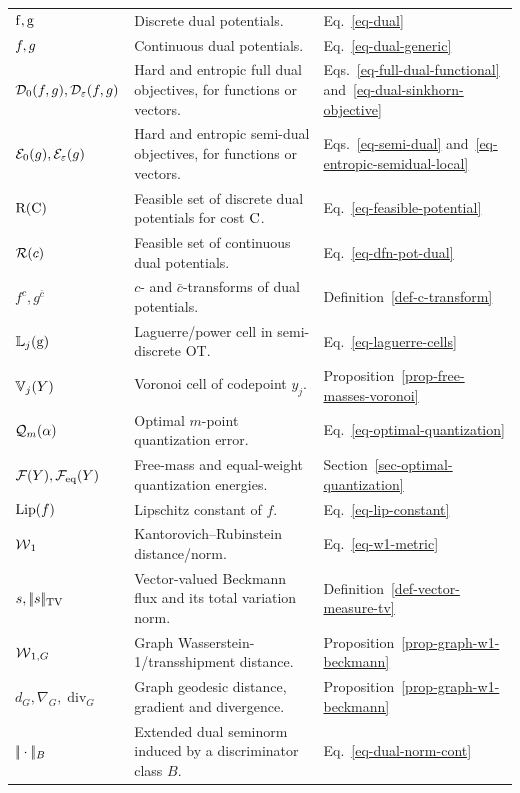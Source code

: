 {\begin{longtable}{>{\raggedright\arraybackslash}p{}
                  >{\raggedright\arraybackslash}p{}
                  >{\raggedright\arraybackslash}p{}}
\hline
\multicolumn{3}{l}{\textbf{Duality, transforms and weak norms}}\\
\hline
$\mathrm{f},\mathrm{g}$ & Discrete dual potentials. & Eq.~\eqref{eq-dual} \\
$f,g$ & Continuous dual potentials. & Eq.~\eqref{eq-dual-generic} \\
$\mathcal{D}_0(f,g),\mathcal{D}_\varepsilon(f,g)$ & Hard and entropic full dual objectives, for functions or vectors. & Eqs.~\eqref{eq-full-dual-functional} and~\eqref{eq-dual-sinkhorn-objective} \\
$\mathcal{E}_0(g),\mathcal{E}_\varepsilon(g)$ & Hard and entropic semi-dual objectives, for functions or vectors. & Eqs.~\eqref{eq-semi-dual} and~\eqref{eq-entropic-semidual-local} \\
$\mathrm{R}(\mathrm{C})$ & Feasible set of discrete dual potentials for cost $\mathrm{C}$. & Eq.~\eqref{eq-feasible-potential} \\
$\mathcal{R}(c)$ & Feasible set of continuous dual potentials. & Eq.~\eqref{eq-dfn-pot-dual} \\
$f^c,g^{\bar c}$ & $c$- and $\bar c$-transforms of dual potentials. & Definition~\ref{def-c-transform} \\
$\mathbb{L}_j(\mathrm{g})$ & Laguerre/power cell in semi-discrete OT\@. & Eq.~\eqref{eq-laguerre-cells} \\
$\mathbb{V}_j(Y)$ & Voronoi cell of codepoint $y_j$. & Proposition~\ref{prop-free-masses-voronoi} \\
$\mathcal{Q}_m(\alpha)$ & Optimal $m$-point quantization error. & Eq.~\eqref{eq-optimal-quantization} \\
$\mathcal{F}(Y),\mathcal{F}_{\rm eq}(Y)$ & Free-mass and equal-weight quantization energies. & Section~\ref{sec-optimal-quantization} \\
$\operatorname{Lip}(f)$ & Lipschitz constant of $f$. & Eq.~\eqref{eq-lip-constant} \\
$\operatorname{\mathcal{W}}_1$ & Kantorovich--Rubinstein distance/norm. & Eq.~\eqref{eq-w1-metric} \\
$s,|\!| s |\!|_{\operatorname{TV}}$ & Vector-valued Beckmann flux and its total variation norm. & Definition~\ref{def-vector-measure-tv} \\
$\operatorname{\mathcal{W}}_{1,G}$ & Graph Wasserstein-1/transshipment distance. & Proposition~\ref{prop-graph-w1-beckmann} \\
$d_G,\nabla_G,\operatorname{div}_G$ & Graph geodesic distance, gradient and divergence. & Proposition~\ref{prop-graph-w1-beckmann} \\
$|\!| \cdot |\!|_B$ & Extended dual seminorm induced by a discriminator class $B$. & Eq.~\eqref{eq-dual-norm-cont} \\

\end{longtable}}
